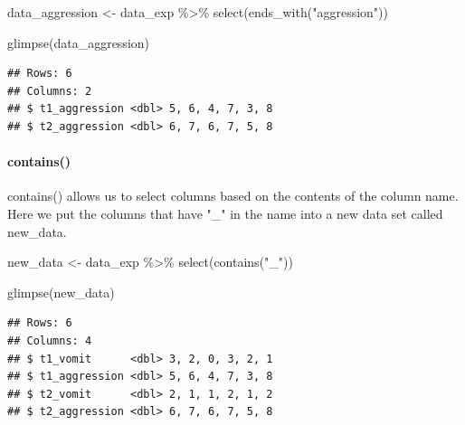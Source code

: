 \documentclass[
]{krantz}
\makeatletter
\newenvironment{Shaded}{\begin{snugshade}}{\end{snugshade}}
\newcommand{\FunctionTok}[1]{\textcolor[rgb]{0,0,0}{#1}}
\newcommand{\NormalTok}[1]{#1}
\newcommand{\OtherTok}[1]{\textcolor[rgb]{0.37,0.37,0.37}{#1}}
\newcommand{\SpecialCharTok}[1]{\textcolor[rgb]{0,0,0}{#1}}
\newcommand{\StringTok}[1]{\textcolor[rgb]{0.5,0.5,0.5}{#1}}
\newenvironment{kframe}{%
\medskip{}
\setlength{\fboxsep}{.8em}
 \def\at@end@of@kframe{}%
 \ifinner\ifhmode%
  \def\at@end@of@kframe{\end{minipage}}%
  \begin{minipage}{\columnwidth}%
 \fi\fi%
 \def\FrameCommand##1{\hskip\@totalleftmargin \hskip-\fboxsep
 \colorbox{shadecolor}{##1}\hskip-\fboxsep
     \hskip-\linewidth \hskip-\@totalleftmargin \hskip\columnwidth}%
 \MakeFramed {\advance\hsize-\width
   \@totalleftmargin\z@ \linewidth\hsize
   \@setminipage}}%
 {\par\unskip\endMakeFramed%
 \at@end@of@kframe}
\renewenvironment{Shaded}{\begin{kframe}}{\end{kframe}}
\makeatother
\begin{document}
\begin{Shaded}
\begin{Highlighting}[]
\NormalTok{data\_aggression }\OtherTok{\textless{}{-}}\NormalTok{ data\_exp }\SpecialCharTok{\%\textgreater{}\%} 
  \FunctionTok{select}\NormalTok{(}\FunctionTok{ends\_with}\NormalTok{(}\StringTok{"aggression"}\NormalTok{))}
\end{Highlighting}
\end{Shaded}

\begin{Shaded}
\begin{Highlighting}[]
\FunctionTok{glimpse}\NormalTok{(data\_aggression)}
\end{Highlighting}
\end{Shaded}

\begin{verbatim}
## Rows: 6
## Columns: 2
## $ t1_aggression <dbl> 5, 6, 4, 7, 3, 8
## $ t2_aggression <dbl> 6, 7, 6, 7, 5, 8
\end{verbatim}

\hypertarget{contains}{%
\paragraph{contains()}\label{contains}}

contains() allows us to select columns based on the contents of the column name. Here we put the columns that have "\_" in the name into a new data set called new\_data.

\begin{Shaded}
\begin{Highlighting}[]
\NormalTok{new\_data }\OtherTok{\textless{}{-}}\NormalTok{ data\_exp }\SpecialCharTok{\%\textgreater{}\%} 
  \FunctionTok{select}\NormalTok{(}\FunctionTok{contains}\NormalTok{(}\StringTok{"\_"}\NormalTok{))}
\end{Highlighting}
\end{Shaded}

\begin{Shaded}
\begin{Highlighting}[]
\FunctionTok{glimpse}\NormalTok{(new\_data)}
\end{Highlighting}
\end{Shaded}

\begin{verbatim}
## Rows: 6
## Columns: 4
## $ t1_vomit      <dbl> 3, 2, 0, 3, 2, 1
## $ t1_aggression <dbl> 5, 6, 4, 7, 3, 8
## $ t2_vomit      <dbl> 2, 1, 1, 2, 1, 2
## $ t2_aggression <dbl> 6, 7, 6, 7, 5, 8
\end{verbatim}
\end{document}
